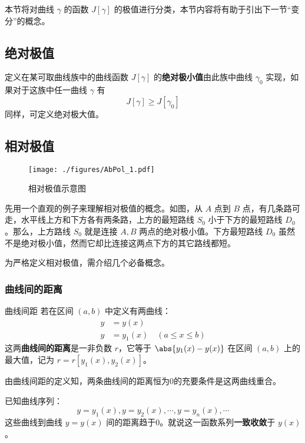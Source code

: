 

本节将对曲线 $\gamma$ 的函数 $J[\gamma]$ 的极值进行分类，本节内容将有助于引出下一节“变分”的概念。

\subsection{绝对极值}
定义在某可取曲线族中的曲线函数 $J[\gamma]$ 的\textbf{绝对极小值}由此族中曲线 $\gamma_0$ 实现，如果对于这族中任一曲线 $\gamma$ 有
\begin{equation}
J[\gamma]\geq J[\gamma_0]
\end{equation}
同样，可定义绝对极大值。
\subsection{相对极值}\label{AbPol_sub1}
\begin{figure}[ht]
\centering
\texttt{[image: ./figures/AbPol\_1.pdf]}
\caption{相对极值示意图} \label{AbPol_fig1}
\end{figure}

先用一个直观的例子来理解相对极值的概念。如图，从 $A$ 点到 $B$ 点，有几条路可走，水平线上方和下方各有两条路，上方的最短路线 $S_0$ 小于下方的最短路线 $D_0$ 。那么，上方路线 $S_0$ 就是连接 $A,B$ 两点的绝对极小值。下方最短路线 $D_0$ 虽然不是绝对极小值，然而它却比连接这两点下方的其它路线都短。 

为严格定义相对极值，需介绍几个必备概念。
\subsubsection{曲线间的距离}
\begin{definition}{曲线间距}
若在区间 $(a,b)$ 中定义有两曲线：
\begin{equation}
\begin{aligned}
y&=y(x)\\
y&=y_1(x)\quad(a\leq x\leq b)
\end{aligned}
\end{equation}
这两\textbf{曲线间的距离}是一非负数 $r$，它等于 $\abs{y_1(x)-y(x)}$ 在区间 $(a,b)$ 上的最大值，记为 $r=r[y_1(x),y_2(x)]$。
\end{definition}
由曲线间距的定义知，两条曲线间的距离恒为0的充要条件是这两曲线重合。

已知曲线序列：
\begin{equation}
y=y_1(x),y=y_2(x),\cdots,y=y_n(x),\cdots
\end{equation}
这些曲线到曲线 $y=y(x)$ 间的距离趋于0。就说这一函数系列\textbf{一致收敛}于 $y(x)$。

